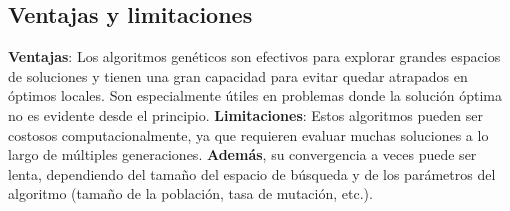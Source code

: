 \subsection{Ventajas y limitaciones}\label{subsec:ventajas-y-limitaciones2}
\textbf{Ventajas}: Los algoritmos genéticos son efectivos para explorar grandes espacios de soluciones y tienen una
gran capacidad para evitar quedar atrapados en óptimos locales.
Son especialmente útiles en problemas donde la solución óptima no es evidente desde el principio.
\textbf{Limitaciones}: Estos algoritmos pueden ser costosos computacionalmente, ya que requieren evaluar muchas
soluciones a lo largo de múltiples generaciones.
\textbf{Además}, su convergencia a veces puede ser lenta, dependiendo del tamaño del espacio de búsqueda y de los
parámetros del algoritmo (tamaño de la población, tasa de mutación, etc.).